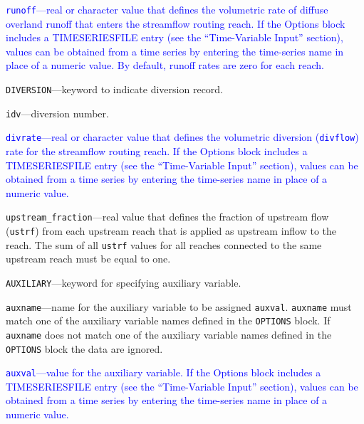 \item \textcolor{blue}{\texttt{runoff}---real or character value that defines the volumetric rate of diffuse overland runoff that enters the streamflow routing reach. If the Options block includes a TIMESERIESFILE entry (see the ``Time-Variable Input'' section), values can be obtained from a time series by entering the time-series name in place of a numeric value. By default, runoff rates are zero for each reach.}

\item \texttt{DIVERSION}---keyword to indicate diversion record.

\item \texttt{idv}---diversion number.

\item \textcolor{blue}{\texttt{divrate}---real or character value that defines the volumetric diversion (\texttt{divflow}) rate for the streamflow routing reach. If the Options block includes a TIMESERIESFILE entry (see the ``Time-Variable Input'' section), values can be obtained from a time series by entering the time-series name in place of a numeric value.}

\item \texttt{upstream\_fraction}---real value that defines the fraction of upstream flow (\texttt{ustrf}) from each upstream reach that is applied as upstream inflow to the reach. The sum of all \texttt{ustrf} values for all reaches connected to the same upstream reach must be equal to one.

\item \texttt{AUXILIARY}---keyword for specifying auxiliary variable.

\item \texttt{auxname}---name for the auxiliary variable to be assigned \texttt{auxval}.  \texttt{auxname} must match one of the auxiliary variable names defined in the \texttt{OPTIONS} block. If \texttt{auxname} does not match one of the auxiliary variable names defined in the \texttt{OPTIONS} block the data are ignored.

\item \textcolor{blue}{\texttt{auxval}---value for the auxiliary variable.  If the Options block includes a TIMESERIESFILE entry (see the ``Time-Variable Input'' section), values can be obtained from a time series by entering the time-series name in place of a numeric value.}


